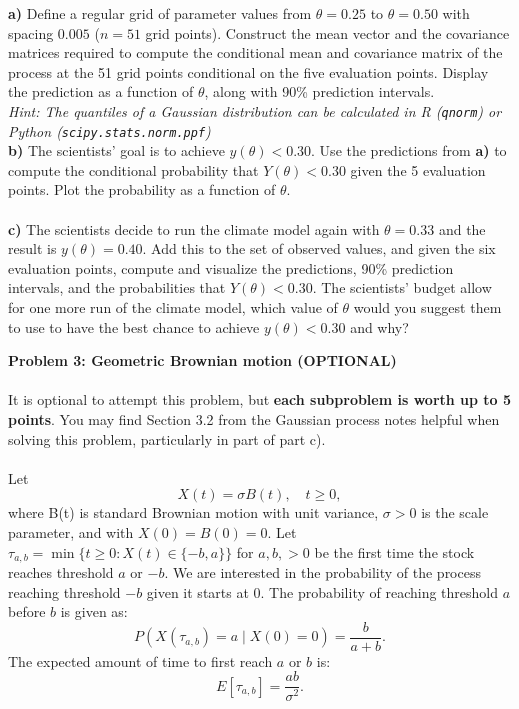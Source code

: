 \documentclass[1p]{article}		%
\begin{document}
\noindent
\textbf{a)} Define a regular grid of parameter values from $\theta = 0.25$ to 
$\theta = 0.50$ with spacing $0.005$ ($n = 51$ grid points). Construct the mean
vector and the covariance matrices required to compute the conditional mean
and covariance matrix of the process at the 51 grid points conditional on the five
evaluation points. Display the prediction as a function of $\theta$, 
along with 90\% prediction intervals.\\[0.2cm] 
\emph{Hint: The quantiles of a Gaussian distribution can be calculated in R (\texttt{qnorm}) or Python \linebreak(\texttt{scipy.stats.norm.ppf})} \\[0.3cm]
\textbf{b)} The scientists' goal is to achieve $y(\theta) < 0.30$. Use the predictions
from \textbf{a)} to compute the conditional probability that $Y(\theta) < 0.30$ given
the 5 evaluation points. Plot the probability as a function of $\theta$.\\\\
\textbf{c)} The scientists decide to run the climate model again with 
$\theta = 0.33$ and the result is $y(\theta) = 0.40$. Add this to the set of observed
values, and given the six evaluation points, compute and visualize the predictions, 90\%
prediction intervals, and the probabilities that $Y(\theta) < 0.30$. The scientists'
budget allow for one more run of the climate model, which value of $\theta$ would you
suggest them to use to have the best chance to achieve $y(\theta) < 0.30$ and why?

\newpage 
\noindent
{\LARGE \textbf{Problem 3: Geometric Brownian motion (OPTIONAL)}}\\\\
It is optional to attempt this problem, but \textbf{each subproblem is worth up to 5 points}. You may find Section 3.2 from the Gaussian process notes helpful when solving this problem, particularly in part of part c). \\\\
Let
\begin{equation}
	X(t) = \sigma B(t), \quad t \geq 0,
\end{equation}
where B(t) is standard Brownian motion with unit variance, $\sigma > 0$ is the scale parameter, and with $X(0) = B(0) = 0$. Let $\tau_{a,b} = \min\{t\geq 0: X(t) \in \{-b, a\}\}$ for $a, b, > 0$ be the first time the stock reaches threshold $a$ or $-b$. We are interested in the probability of the process reaching threshold $-b$ given it starts at 0. The probability of reaching threshold $a$ before $b$ is given as: 
\begin{equation}
P(X(\tau_{a,b})=a \mid X(0)=0)= \frac{b}{a+b}.
\end{equation}
The expected amount of time to first reach $a$ or $b$ is:
\begin{equation}
E[\tau_{a,b}] = \frac{ab}{\sigma^2}.
\end{equation}
\end{document}
